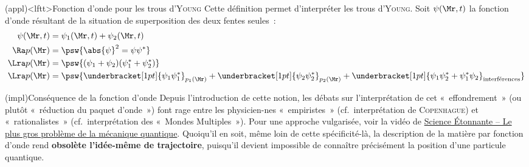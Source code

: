 \documentclass[../../main/main.tex]{subfiles}
\begin{document}
\begin{tcb}(appl)<lftt>{Fonction d'onde pour les trous d'\textsc{Young}}
	Cette définition permet d'interpréter les trous d'\textsc{Young}. Soit
	$\psi(\Mr,t)$ la fonction d'onde résultant de la situation de superposition
	des deux fentes seules~:
	\begin{align*}
		\psi (\Mr,t) & =
		\psi_1(\Mr,t) + \psi_2(\Mr,t)
		\\\Ra
		p (\Mr)      & =
		\psw{\abs{\psi}^2 = \psi \psi^*}
		\\\Lra
		p (\Mr)      & =
		\psw{(\psi_1 + \psi_2)(\psi_1^* + \psi_2^*)}
		\\\Lra
		p (\Mr)      & =
		\psw{%
		\underbracket[1pt]{\psi_1\psi_1^*}_{p_1(\Mr)} +
		\underbracket[1pt]{\psi_2\psi_2^*}_{p_2(\Mr)} +
		\underbracket[1pt]{\psi_1\psi_2^* + \psi_1^*\psi_2}_{\text{interférences}}
		}%
	\end{align*}
\end{tcb}

\begin{tcb*}[breakable](impl){Conséquence de la fonction d'onde}
	Depuis l'introduction de cette notion, les débats sur l'interprétation de cet
	«~effondrement~» (ou plutôt «~réduction du paquet d'onde~») font rage entre
	les physicien-nes «~empiristes~» (cf.\ interprétation de \textsc{Copenhague})
	et «~rationalistes~» (cf.\ interprétation des «~Mondes Multiples~»). Pour une
	approche vulgarisée, voir la vidéo de
	\href{https://www.youtube.com/watch?v=v3eSu9ac7Wk}{Science Étonnante -- Le
		plus gros problème de la mécanique quantique}.
	\bigbreak
	Quoiqu'il en soit, même loin de cette spécificité-là, la description de la
	matière par fonction d'onde rend \textbf{obsolète l'idée-même de trajectoire},
	puisqu'il devient impossible de connaître précisément la position d'une
	particule quantique.
\end{tcb*}
\end{document}
